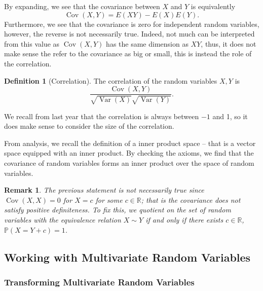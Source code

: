 \documentclass[
]{article}
\newtheorem*{remark}{Remark}
\theoremstyle{definition}
\newtheorem{definition}{Definition}[section]
\begin{document}
By expanding, we see that the covariance between \(X\) and \(Y\) is
equivalently \[\mathop{\mathrm{Cov}}(X, Y) = E(XY) - E(X)E(Y).\]
Furthermore, we see that the covariance is zero for independent random
variables, however, the reverse is not necessarily true. Indeed, not
much can be interpreted from this value as
\(\mathop{\mathrm{Cov}}(X, Y)\) has the same dimension as \(XY\), thus,
it does not make sense the refer to the covariance as big or small, this
is instead the role of the correlation.

\begin{definition}[Correlation]
  The correlation of the random variables \(X, Y\) is
  \[\frac{\mathop{\mathrm{Cov}}(X, Y)}{\sqrt{\mathop{\mathrm{Var}}(X)} \sqrt{\mathop{\mathrm{Var}}(Y)}}.\]
\end{definition}

We recall from last year that the correlation is always between \(-1\)
and 1, so it does make sense to consider the size of the correlation.

From analysis, we recall the definition of a inner product space -- that
is a vector space equipped with an inner product. By checking the
axioms, we find that the covariance of random variables forms an inner
product over the space of random variables.

\begin{remark}
  The previous statement is not necessarily true since \(\mathop{\mathrm{Cov}}(X, X) = 0\) for 
  \(X = c\) for some \(c \in \mathbb{R}\); that is the covariance does not 
  satisfy positive definiteness. To fix this, we quotient on the set of random 
  variables with the equivalence relation \(X \sim Y\) if and only if there exists 
  \(c \in \mathbb{R}\), \(\mathbb{P}(X = Y + c) = 1\).
\end{remark}

\hypertarget{working-with-multivariate-random-variables}{%
\subsection{Working with Multivariate Random
Variables}\label{working-with-multivariate-random-variables}}

\hypertarget{transforming-multivariate-random-variables}{%
\subsubsection{Transforming Multivariate Random
Variables}\label{transforming-multivariate-random-variables}}
\end{document}
